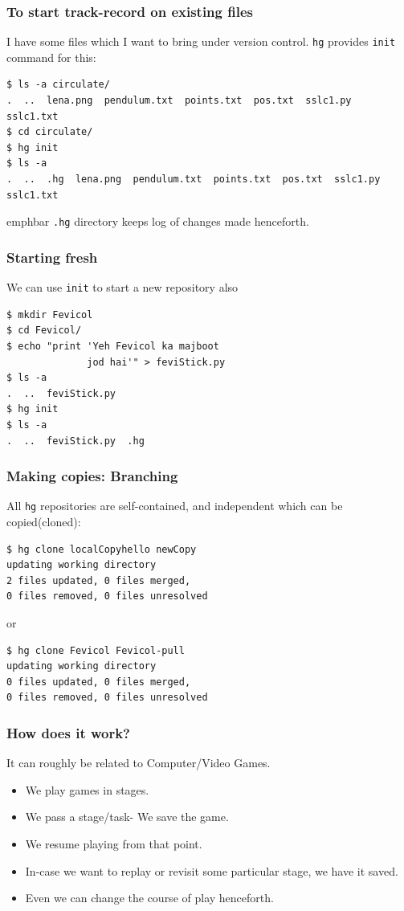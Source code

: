 \documentclass[14pt,compress]{beamer}
\newcommand{\emphbar}[1]
{\begin{beamercolorbox}[rounded=true]{emphbar} 
      {#1}
 \end{beamercolorbox}
}
\newcounter{time}
\newcommand{\inctime}[1]{\addtocounter{time}{#1}{\tiny \thetime\ m}}
\newcommand{\typ}[1]{\lstinline{#1}}
\begin{document}
\begin{frame}[fragile]
  \frametitle{To start track-record on existing files}
  I have some files which I want to bring under version control. \typ{hg} provides \typ{init} command for this: 
  \begin{lstlisting}
$ ls -a circulate/
.  ..  lena.png  pendulum.txt  points.txt  pos.txt  sslc1.py  sslc1.txt
$ cd circulate/
$ hg init
$ ls -a
.  ..  .hg  lena.png  pendulum.txt  points.txt  pos.txt  sslc1.py  sslc1.txt    
  \end{lstlisting}
  \emphbar{\typ{.hg} directory keeps log of changes made henceforth.}
\end{frame}

\begin{frame}[fragile]
  \frametitle{Starting fresh}
  We can use \typ{init} to start a new repository also
  \begin{lstlisting}
$ mkdir Fevicol
$ cd Fevicol/
$ echo "print 'Yeh Fevicol ka majboot 
              jod hai'" > feviStick.py
$ ls -a
.  ..  feviStick.py
$ hg init
$ ls -a
.  ..  feviStick.py  .hg
  \end{lstlisting}
\end{frame}

\begin{frame}[fragile]
  \frametitle{Making copies: Branching}
  All \typ{hg} repositories are self-contained, and independent which can be copied(cloned):
  \begin{lstlisting}
$ hg clone localCopyhello newCopy
updating working directory
2 files updated, 0 files merged, 
0 files removed, 0 files unresolved
  \end{lstlisting}
  or
  \begin{lstlisting}
$ hg clone Fevicol Fevicol-pull
updating working directory
0 files updated, 0 files merged, 
0 files removed, 0 files unresolved
  \end{lstlisting}
  \inctime{15}
\end{frame}


\begin{frame}[fragile]
  \frametitle{How does it work?}
  It can roughly be related to Computer/Video Games.
  \begin{itemize}
  \item We play games in stages.
  \item We pass a stage/task- We save the game.
  \item We resume playing from that point.
  \item In-case we want to replay or revisit some particular stage, we have it saved.
  \item Even we can change the course of play henceforth.
  \end{itemize}
\end{frame}
\end{document}
